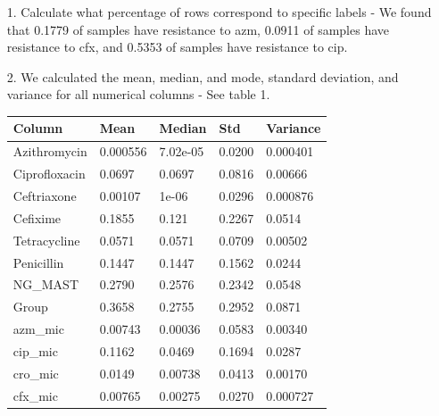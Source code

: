 \documentclass[manuscript,screen,review, nonacm]{acmart}
\begin{document}
\begin{itemize}
    \item[1.] Calculate what percentage of rows correspond to specific labels - We found that 0.1779 of samples have resistance to azm, 
    0.0911 of samples have resistance to cfx, and 0.5353 of samples have resistance to cip.
    \item[2.] We calculated the mean, median, and mode, standard deviation, and variance for all numerical columns - See table 1.
    \begin{table}[H]
        \centering
        \begin{tabular}{|l|l|l|l|l|}
        \hline
        \textbf{Column}       & \textbf{Mean}    & \textbf{Median}  & \textbf{Std}     & \textbf{Variance} \\ \hline
        Azithromycin          & 0.000556         & 7.02e-05         & 0.0200           & 0.000401          \\ \hline
        Ciprofloxacin         & 0.0697           & 0.0697           & 0.0816           & 0.00666           \\ \hline
        Ceftriaxone           & 0.00107          & 1e-06            & 0.0296           & 0.000876          \\ \hline
        Cefixime              & 0.1855           & 0.121            & 0.2267           & 0.0514            \\ \hline
        Tetracycline          & 0.0571           & 0.0571           & 0.0709           & 0.00502           \\ \hline
        Penicillin            & 0.1447           & 0.1447           & 0.1562           & 0.0244            \\ \hline
        NG\_MAST              & 0.2790           & 0.2576           & 0.2342           & 0.0548            \\ \hline
        Group                 & 0.3658           & 0.2755           & 0.2952           & 0.0871            \\ \hline
        azm\_mic              & 0.00743          & 0.00036          & 0.0583           & 0.00340           \\ \hline
        cip\_mic              & 0.1162           & 0.0469           & 0.1694           & 0.0287            \\ \hline
        cro\_mic              & 0.0149           & 0.00738          & 0.0413           & 0.00170           \\ \hline
        cfx\_mic              & 0.00765          & 0.00275          & 0.0270           & 0.000727          \\ \hline

\end{tabular}
\end{table}
\end{itemize}
\end{document}
